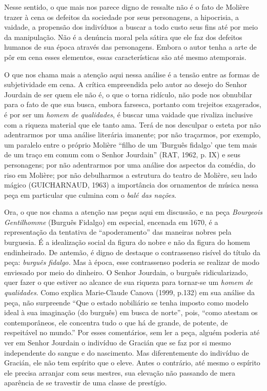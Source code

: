 Nesse sentido, o que mais nos parece digno de ressalte não é o fato de
Molière trazer à cena os defeitos da sociedade por seus personagens, a
hipocrisia, a vaidade, a propensão dos indivíduos a buscar a todo custo
seus fins até por meio da manipulação. Não é a denúncia moral pela
sátira que ele faz dos defeitos humanos de sua época através das
personagens. Embora o autor tenha a arte de pôr em cena esses elementos,
essas características são até mesmo atemporais.

O que nos chama mais a atenção aqui nessa análise é a tensão entre as
formas de subjetividade em cena. A crítica empreendida pelo autor ao
desejo do Senhor Jourdain de ser quem ele não é, o que o torna ridículo,
não pode nos obnubilar para o fato de que sua busca, embora farsesca,
portanto com trejeitos exagerados, é por ser um \emph{homem de
qualidades}, é buscar uma vaidade que rivaliza inclusive com a riqueza
material que ele tanto ama. Terá de nos desculpar o esteta por não
adentrarmos por uma análise literária imanente; por não traçarmos, por
exemplo, um paralelo entre o próprio Molière ``filho de um 'Burguês
fidalgo' que tem mais de um traço em comum com o Senhor Jourdain'' (RAT,
1962, p. IX) e seus personagens; por não adentrarmos por uma análise dos
aspectos da comédia, do riso em Molière; por não debulharmos a estrutura
do teatro de Molière, seu lado mágico (GUICHARNAUD, 1963) a importância
dos ornamentos de música nessa peça em particular que culmina com o
\emph{balé das nações}.

Ora, o que nos chama a atenção nas peças aqui em discussão, e na peça
\emph{Bourgeois} \emph{Gentilhomme} (Burguês Fidalgo) em especial,
encenada em 1670, é a representação da tentativa de ``apoderamento'' das
maneiras nobres pela burguesia. É a idealização social da figura do
nobre e não da figura do homem endinheirado. De antemão, é digno de
destaque o contrassenso risível do título da peça: \emph{burguês}
\emph{fidalgo.} Mas à época, esse contrassenso poderia se realizar de
modo enviesado por meio do dinheiro. O Senhor Jourdain, o burguês
ridicularizado, quer fazer o que estiver ao alcance de sua riqueza para
tornar-se um \emph{homem de qualidades}. Como explica Marie-Claude
Canova (1999, p.132) em sua análise da peça, não surpreende ``Que o
estado nobiliário se tenha imposto como modelo ideal à sua imaginação
(do burguês) em busca de norte'', pois, ``como atestam os
contemporâneos, ele concentra tudo o que há de grande, de potente, de
respeitável no mundo.'' Por esses comentários, sem ler a peça, alguém
poderia até ver em Senhor Jourdain o indivíduo de Gracián que se faz por
si mesmo independente do sangue e do nascimento. Mas diferentemente do
indivíduo de Gracián, ele não tem espírito que o eleve. Antes o
contrário, até mesmo o espírito ele precisa arranjar com seus mestres,
sua elevação não passando de mera aparência de se travestir de uma
classe de prestígio.

